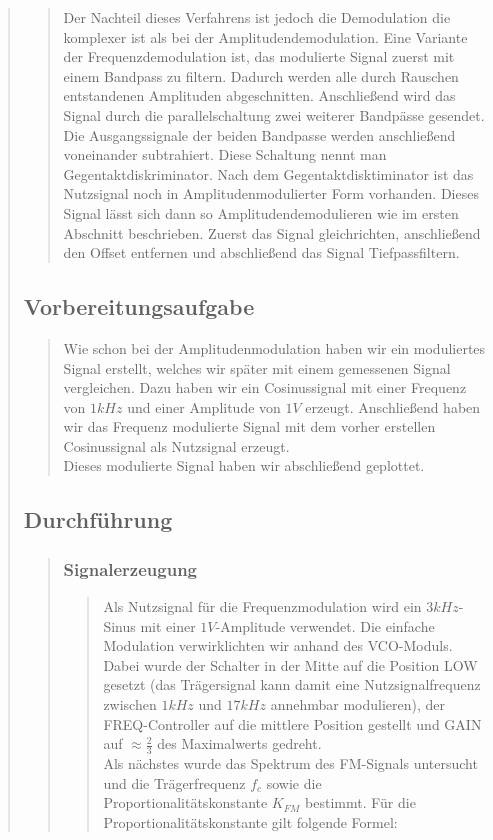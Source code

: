 \begin{quote}
\begin{quote}
        Der Nachteil dieses Verfahrens ist jedoch die Demodulation die komplexer ist als bei der Amplitudendemodulation.
        Eine Variante der Frequenzdemodulation ist, das modulierte Signal zuerst mit einem Bandpass zu filtern. Dadurch
        werden alle durch Rauschen entstandenen Amplituden abgeschnitten. Anschließend wird das Signal durch die
        parallelschaltung zwei weiterer Bandpässe gesendet. Die Ausgangssignale der beiden Bandpasse werden anschließend
        voneinander subtrahiert. Diese Schaltung nennt man Gegentaktdiskriminator. Nach dem Gegentaktdisktiminator ist
        das Nutzsignal noch in Amplitudenmodulierter Form vorhanden. Dieses Signal lässt sich dann so
        Amplitudendemodulieren wie im ersten Abschnitt beschrieben. Zuerst das Signal gleichrichten, anschließend den
        Offset entfernen und abschließend das Signal Tiefpassfiltern.
    
    \end{quote}
    
    \subsection{Vorbereitungsaufgabe}
    \begin{quote}
        Wie schon bei der Amplitudenmodulation  haben wir ein moduliertes Signal erstellt, welches wir später mit einem
        gemessenen Signal vergleichen. Dazu haben wir ein Cosinussignal mit einer Frequenz von
        $1kHz$ und einer Amplitude von $1V$ erzeugt. Anschließend haben wir das Frequenz modulierte Signal mit dem
        vorher erstellen Cosinussignal als Nutzsignal erzeugt.\\
        Dieses modulierte Signal haben wir abschließend geplottet.
    \end{quote}
    
    \subsection{Durchführung}
    \begin{quote}
        \subsubsection{Signalerzeugung}
        \begin{quote}
        Als Nutzsignal für die Frequenzmodulation wird ein $3 kHz$-Sinus mit
        einer $1 V$-Amplitude verwendet. Die einfache Modulation verwirklichten
        wir anhand des VCO-Moduls. Dabei wurde der Schalter in der Mitte auf
        die Position LOW gesetzt (das Trägersignal kann damit eine
        Nutzsignalfrequenz zwischen $1 kHz$ und $17 kHz$ annehmbar modulieren),
        der FREQ-Controller auf die mittlere Position gestellt und GAIN auf
        $\approx \frac{2}{3}$ des Maximalwerts gedreht.\\
        Als nächstes wurde das Spektrum des FM-Signals untersucht und die
        Trägerfrequenz $f_c$ sowie die Proportionalitätskonstante $K_{FM}$
        bestimmt. Für die Proportionalitätskonstante gilt folgende Formel:
        

\end{quote}
\end{quote}
\end{quote}

